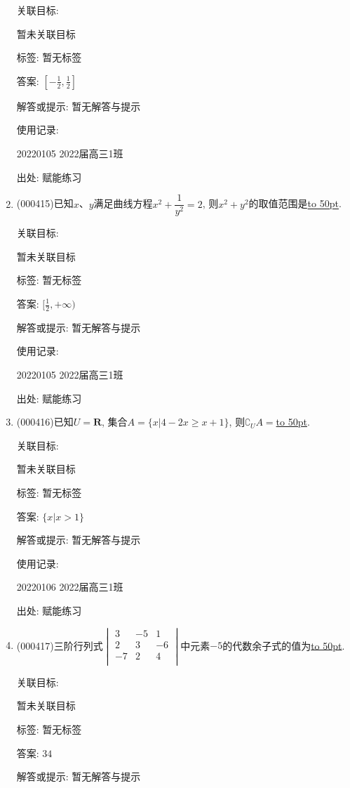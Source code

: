 \documentclass[10pt,a4paper]{article}
\newcommand{\blank}[1]{\underline{\hbox to #1pt{}}}
\begin{document}
\begin{enumerate}[1.]
关联目标:

暂未关联目标



标签: 暂无标签

答案: $[-\frac 12,\frac 12]$

解答或提示: 暂无解答与提示

使用记录:

20220105	2022届高三1班	


出处: 赋能练习
\item { (000415)}已知$x$、$y$满足曲线方程$x^2+\dfrac1{y^2}=2$, 则$x^2+y^2$的取值范围是\blank{50}.


关联目标:

暂未关联目标



标签: 暂无标签

答案: $[\frac 12,+\infty)$

解答或提示: 暂无解答与提示

使用记录:

20220105	2022届高三1班	


出处: 赋能练习
\item { (000416)}已知$U=\mathbf{R}$, 集合$A=\{x|4-2x\ge x+1\}$, 则${\complement_U}A=$\blank{50}.


关联目标:

暂未关联目标



标签: 暂无标签

答案: $\{x|x>1\}$

解答或提示: 暂无解答与提示

使用记录:

20220106	2022届高三1班	


出处: 赋能练习
\item { (000417)}三阶行列式$\begin{vmatrix}   3 & -5 & 1 \\   2 & 3 & -6 \\   -7 & 2 & 4 \\ \end{vmatrix}$中元素$-5$的代数余子式的值为\blank{50}.


关联目标:

暂未关联目标



标签: 暂无标签

答案: $34$

解答或提示: 暂无解答与提示


\end{enumerate}
\end{document}
